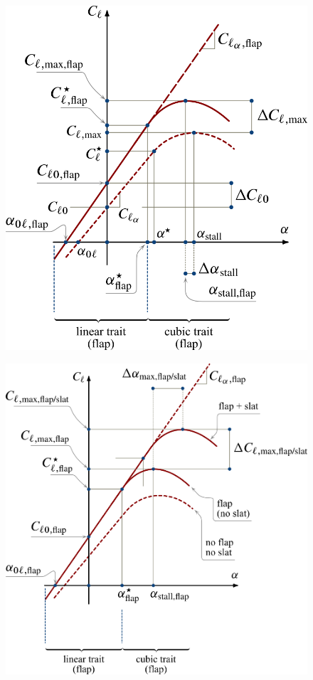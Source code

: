 \begin{figure}
\centering
\begin{minipage}{.5\textwidth}
\centering
\includegraphics[width=.9\linewidth]{FlapEffects}
\label{fig:FlapEffects}
\end{minipage}%
\begin{minipage}{.5\textwidth}
\centering
\includegraphics[width=\linewidth]{SlatEffects}
\label{fig:SlatEffects}
\end{minipage}
\label{fig:FlapSlatEffects}
\end{figure}
